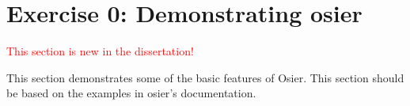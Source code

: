 \section{Exercise 0: Demonstrating \ac{osier}}
\textcolor{red}{This section is new in the dissertation!}

This section demonstrates some of the basic features of Osier. This section should be based 
on the examples in \ac{osier}'s documentation.
